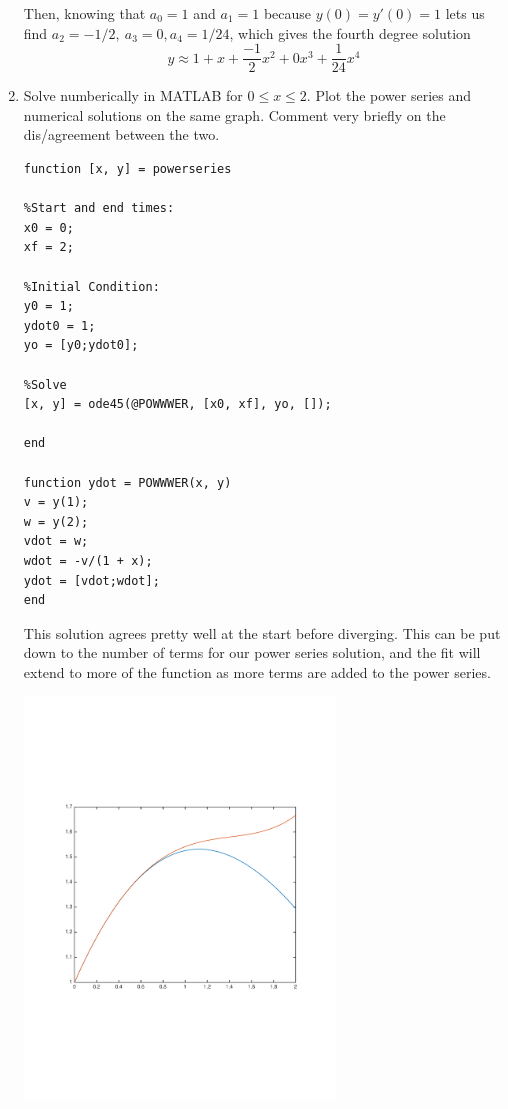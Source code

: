 \documentclass[11pt,answers]{exam}
\begin{document}
\begin{questions}
\begin{solution}
\begin{enumerate}
Then, knowing that $a_0 = 1$ and $a_1 = 1$ because $y(0) = y'(0) = 1$ lets us find $a_2 = -1/2, \: a_3 = 0, a_4 = 1/24$, which gives the fourth degree solution
\[
y \approx 1 + x + \frac{-1}{2}x^2 + 0x^3 + \frac{1}{24}x^4
\]

\item Solve numberically in \textsc{MATLAB} for $0 \leq x \leq 2$.  Plot the power series and numerical solutions on the same graph.  Comment very briefly on the dis/agreement between the two.

\begin{verbatim}
function [x, y] = powerseries

%Start and end times:
x0 = 0;
xf = 2;

%Initial Condition:
y0 = 1;
ydot0 = 1;
yo = [y0;ydot0];

%Solve
[x, y] = ode45(@POWWWER, [x0, xf], yo, []);

end

function ydot = POWWWER(x, y)
v = y(1);
w = y(2);
vdot = w;
wdot = -v/(1 + x);
ydot = [vdot;wdot];
end
\end{verbatim}

This solution agrees pretty well at the start before diverging.  This can be put down to the number of terms for our power series solution, and the fit will extend to more of the function as more terms are added to the power series.
\begin{center}
\includegraphics[width = 0.65\textwidth]{power.pdf}
\end{center}
\end{enumerate}
\end{solution}

\end{questions}
\end{document}
